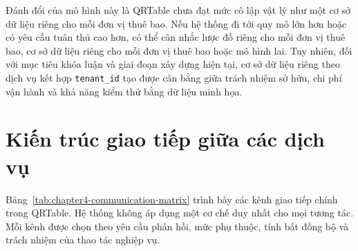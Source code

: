 Đánh đổi của mô hình này là QRTable chưa đạt mức cô lập vật lý như một cơ sở dữ liệu riêng cho mỗi đơn vị thuê bao. Nếu hệ thống đi tới quy mô lớn hơn hoặc có yêu cầu tuân thủ cao hơn, có thể cân nhắc lược đồ riêng cho mỗi đơn vị thuê bao, cơ sở dữ liệu riêng cho mỗi đơn vị thuê bao hoặc mô hình lai. Tuy nhiên, đối với mục tiêu khóa luận và giai đoạn xây dựng hiện tại, cơ sở dữ liệu riêng theo dịch vụ kết hợp \texttt{tenant\_id} tạo được cân bằng giữa trách nhiệm sở hữu, chi phí vận hành và khả năng kiểm thử bằng dữ liệu minh họa.

\section{Kiến trúc giao tiếp giữa các dịch vụ}

Bảng~\ref{tab:chapter4-communication-matrix} trình bày các kênh giao tiếp chính trong QRTable. Hệ thống không áp dụng một cơ chế duy nhất cho mọi tương tác. Mỗi kênh được chọn theo yêu cầu phản hồi, mức phụ thuộc, tính bất đồng bộ và trách nhiệm của thao tác nghiệp vụ.

